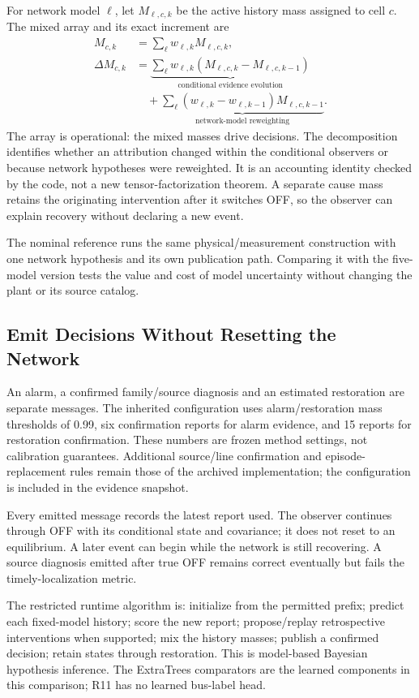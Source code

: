 For network model $\ell$, let $M_{\ell,c,k}$ be the active history mass assigned to cell $c$. The mixed array and its exact increment are
\begin{align}
 M_{c,k}&=\sum_\ell w_{\ell,k}M_{\ell,c,k},\nonumber\\
 \Delta M_{c,k}&=\underbrace{\sum_\ell w_{\ell,k}(M_{\ell,c,k}-M_{\ell,c,k-1})}_{\text{conditional evidence evolution}}\nonumber\\
 &\quad+\underbrace{\sum_\ell(w_{\ell,k}-w_{\ell,k-1})M_{\ell,c,k-1}}_{\text{network-model reweighting}}.
 \label{eq:continuous-delta}
\end{align}
The array is operational: the mixed masses drive decisions. The decomposition identifies whether an attribution changed within the conditional observers or because network hypotheses were reweighted. It is an accounting identity checked by the code, not a new tensor-factorization theorem. A separate cause mass retains the originating intervention after it switches OFF, so the observer can explain recovery without declaring a new event.

The nominal reference runs the same physical/measurement construction with one network hypothesis and its own publication path. Comparing it with the five-model version tests the value and cost of model uncertainty without changing the plant or its source catalog.

\subsection{Emit Decisions Without Resetting the Network}

An alarm, a confirmed family/source diagnosis and an estimated restoration are separate messages. The inherited configuration uses alarm/restoration mass thresholds of 0.99, six confirmation reports for alarm evidence, and 15 reports for restoration confirmation. These numbers are frozen method settings, not calibration guarantees. Additional source/line confirmation and episode-replacement rules remain those of the archived implementation; the configuration is included in the evidence snapshot.

Every emitted message records the latest report used. The observer continues through OFF with its conditional state and covariance; it does not reset to an equilibrium. A later event can begin while the network is still recovering. A source diagnosis emitted after true OFF remains correct eventually but fails the timely-localization metric.

The restricted runtime algorithm is: initialize from the permitted prefix; predict each fixed-model history; score the new report; propose/replay retrospective interventions when supported; mix the history masses; publish a confirmed decision; retain states through restoration. This is model-based Bayesian hypothesis inference. The ExtraTrees comparators are the learned components in this comparison; R11 has no learned bus-label head.

